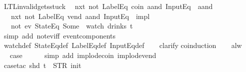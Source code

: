 \begin{isabellebody}
\isanewline
{}\isamarkupfalse%
%
\endisatagproof
{\isafoldproof}%
%
\isadelimproof
\isanewline
%
\endisadelimproof
\isanewline
{}\isamarkupfalse%
\ LTL{\isacharunderscore}invalid{\isacharunderscore}gets{\isacharunderscore}stuck{\isacharunderscore}{}{\isacharcolon}\isanewline
\ \ {\isachardoublequoteopen}{\isacharparenleft}{\isacharparenleft}{\isacharparenleft}nxt\ {\isacharparenleft}not\ {\isacharparenleft}LabelEq\ {\isacharprime}{\isacharprime}coin{\isacharprime}{\isacharprime}\ aand\ InputEq\ {\isacharbrackleft}{\isacharbrackright}{\isacharparenright}{\isacharparenright}{\isacharparenright}\ aand\isanewline
\ \ \ {\isacharparenleft}nxt\ {\isacharparenleft}not\ {\isacharparenleft}LabelEq\ {\isacharprime}{\isacharprime}vend{\isacharprime}{\isacharprime}\ aand\ InputEq\ {\isacharbrackleft}{\isacharbrackright}{\isacharparenright}{\isacharparenright}{\isacharparenright}{\isacharparenright}\ impl\isanewline
\ \ \ {\isacharparenleft}not\ {\isacharparenleft}ev\ {\isacharparenleft}StateEq\ {\isacharparenleft}Some\ {}{\isacharparenright}{\isacharparenright}{\isacharparenright}{\isacharparenright}{\isacharparenright}\ {\isacharparenleft}watch\ drinks\ t{\isacharparenright}{\isachardoublequoteclose}\isanewline
%
\isadelimproof
\ \ %
\endisadelimproof
%
\isatagproof
{}\isamarkupfalse%
\ {\isacharparenleft}simp\ add{\isacharcolon}\ not{\isacharunderscore}ev{\isacharunderscore}iff\ event{\isacharunderscore}components{\isacharparenright}\isanewline
\ \ \isamarkupfalse%
\ watch{\isacharunderscore}def\ StateEq{\isacharunderscore}def\ LabelEq{\isacharunderscore}def\ InputEq{\isacharunderscore}def\isanewline
\ \ \isamarkupfalse%
\ clarify\isanewline
{}\isamarkupfalse%
{\isacharparenleft}coinduction{\isacharparenright}\isanewline
\ \ \isamarkupfalse%
\ alw\isanewline
\ \ \isamarkupfalse%
\ \isamarkupfalse%
\ {\isacharquery}case\isanewline
\ \ \ \ \isamarkupfalse%
\ {\isacharparenleft}simp\ add{\isacharcolon}\ implode{\isacharunderscore}coin\ implode{\isacharunderscore}vend{\isacharparenright}\isanewline
\ \ \ \ \isamarkupfalse%
\ {\isacharparenleft}case{\isacharunderscore}tac\ {\isachardoublequoteopen}shd\ t\ {\isacharequal}\ {\isacharparenleft}STR\ {\isacharprime}{\isacharprime}init{\isacharprime}{\isacharprime}{\isacharcomma}\ {\isacharbrackleft}{\isacharbrackright}{\isacharparenright}{\isachardoublequoteclose}{\isacharparenright}\isanewline
\ \ \ \ \ \isamarkupfalse%

\end{isabellebody}
